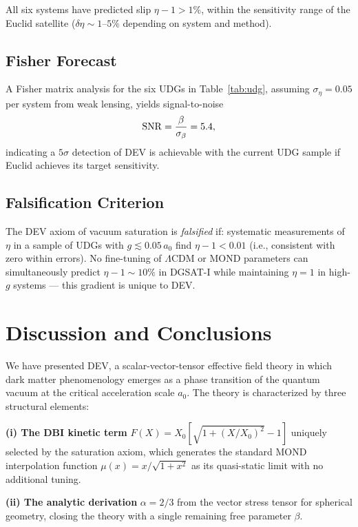 \documentclass[aps,prd,twocolumn,showpacs,superscriptaddress]{revtex4-2}
\newcommand{\aO}{a_0}
\newcommand{\Xzero}{X_0}
\newcommand{\LCDM}{$\Lambda$CDM}
\begin{document}
All six systems have predicted slip $\eta - 1 > 1\%$,
within the sensitivity range of the Euclid satellite
($\delta\eta \sim 1$--$5\%$ depending on system and method).

\subsection{Fisher Forecast}

A Fisher matrix analysis for the six UDGs in Table~\ref{tab:udg},
assuming $\sigma_\eta = 0.05$ per system from weak lensing,
yields signal-to-noise
\begin{equation}
  {\rm SNR} = \frac{\beta}{\sigma_\beta} = 5.4,
\end{equation}
indicating a $5\sigma$ detection of DEV is achievable with
the current UDG sample if Euclid achieves its target sensitivity.

\subsection{Falsification Criterion}

The DEV axiom of vacuum saturation is \emph{falsified} if:
systematic measurements of $\eta$ in a sample of UDGs with
$g \lesssim 0.05\,\aO$ find $\eta - 1 < 0.01$ (i.e., consistent
with zero within errors).
No fine-tuning of \LCDM{} or MOND parameters can simultaneously
predict $\eta - 1 \sim 10\%$ in DGSAT-I while maintaining
$\eta = 1$ in high-$g$ systems — this gradient is unique to DEV.

\section{Discussion and Conclusions}
\label{sec:conclusion}

We have presented DEV, a scalar-vector-tensor effective field theory
in which dark matter phenomenology emerges as a phase transition of
the quantum vacuum at the critical acceleration scale $\aO$.
The theory is characterized by three structural elements:

\textbf{(i) The DBI kinetic term} $F(X) = \Xzero[\sqrt{1+(X/\Xzero)^2}-1]$
uniquely selected by the saturation axiom, which generates the
standard MOND interpolation function $\mu(x) = x/\sqrt{1+x^2}$
as its quasi-static limit with no additional tuning.

\textbf{(ii) The analytic derivation} $\alpha = 2/3$ from the vector
stress tensor for spherical geometry, closing the theory with a
single remaining free parameter $\beta$.
\end{document}
